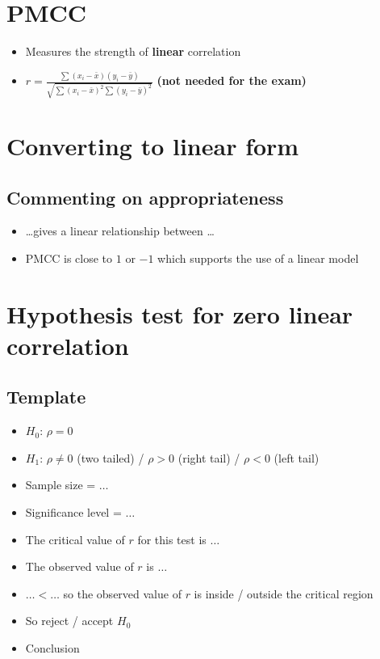 
\section{PMCC}
\begin{itemize}
    \item Measures the strength of \textbf{linear} correlation
    \item $r =\frac{\sum\left(x_{i}-\bar{x}\right)\left(y_{i}-\bar{y}\right)}{\sqrt{\sum\left(x_{i}-\bar{x}\right)^{2} \sum\left(y_{i}-\bar{y}\right)^{2}}}$ \textbf{(not needed for the exam)}
\end{itemize}

\section{Converting to linear form}
\subsection{Commenting on appropriateness}
\begin{itemize}
    \item \dots gives a linear relationship between \dots
    \item PMCC is close to $1$ or $-1$ which supports the use of a linear model
\end{itemize}

\section{Hypothesis test for zero linear correlation}
\subsection{Template}
\begin{itemize}
    \item $H_0$: $\rho = 0$
    \item $H_1$: $\rho \neq 0$ (two tailed) / $\rho > 0$ (right tail) / $\rho < 0$ (left tail)
    \item Sample size = $\dots$
    \item Significance level = $\dots$
    \item The critical value of $r$ for this test is $\dots$
    \item The observed value of $r$ is $\dots$
    \item $\dots < \dots$ so the observed value of $r$ is inside / outside the critical region
    \item So reject / accept $H_0$
    \item Conclusion
\end{itemize}




